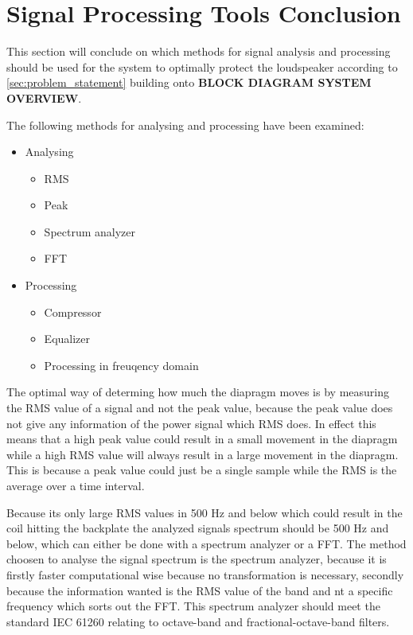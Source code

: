 \section{Signal Processing Tools Conclusion}
This section will conclude on which methods for signal analysis and processing should be used for the system to optimally protect the loudspeaker according to \autoref{sec:problem_statement} building onto \textbf{BLOCK DIAGRAM SYSTEM OVERVIEW}.

The following methods for analysing and processing have been examined:
\begin{itemize}
\item Analysing
\begin{itemize}
\item RMS
\item Peak
\item Spectrum analyzer
\item FFT
\end{itemize}
\item Processing
\begin{itemize}
\item Compressor
\item Equalizer
\item Processing in freuqency domain
\end{itemize}
\end{itemize}

The optimal way of determing how much the diapragm moves is by measuring the RMS value of a signal and not the peak value, because the peak value does not give any information of the power signal which RMS does. In effect this means that a high peak value could result in a small movement in the diapragm while a high RMS value will always result in a large movement in the diapragm. This is because a peak value could just be a single sample while the RMS is the average over a time interval. 

Because its only large RMS values in 500 Hz and below which could result in the coil hitting the backplate the analyzed signals spectrum should be 500 Hz and below, which can either be done with a spectrum analyzer or a FFT. The method choosen to analyse the signal spectrum is the spectrum analyzer, because it is firstly faster computational wise because no transformation is necessary, secondly because the information wanted is the RMS value of the band and nt a specific frequency which sorts out the FFT. This spectrum analyzer should meet the standard IEC 61260 relating to octave-band and fractional-octave-band filters.

